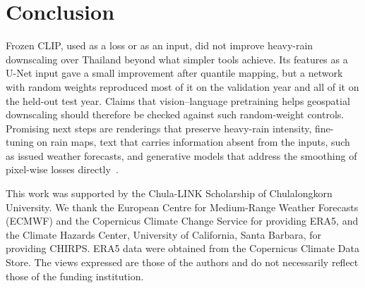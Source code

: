 \documentclass[sigconf]{acmart}
\begin{document}
\section{Conclusion}

Frozen CLIP, used as a loss or as an input, did not improve heavy-rain
downscaling over Thailand beyond what simpler tools achieve. Its features
as a U-Net input gave a small improvement after quantile mapping, but a
network with random weights reproduced most of it on the validation year
and all of it on the held-out test year. Claims
that vision--language pretraining helps geospatial downscaling should
therefore be checked against such random-weight controls. Promising next
steps are renderings that preserve heavy-rain intensity, fine-tuning on
rain maps, text that carries information absent from the inputs, such as
issued weather forecasts, and generative models that address the
smoothing of pixel-wise losses directly~\cite{mardani2025corrdiff}.

\begin{acks}
This work was supported by the Chula-LINK Scholarship of Chulalongkorn
University. We thank the European Centre for
Medium-Range Weather Forecasts (ECMWF) and the Copernicus Climate Change
Service for providing ERA5, and the Climate Hazards Center, University of
California, Santa Barbara, for providing CHIRPS. ERA5 data were obtained
from the Copernicus Climate Data Store. The views expressed are those of
the authors and do not necessarily reflect those of the funding
institution.
\end{acks}



\end{document}
